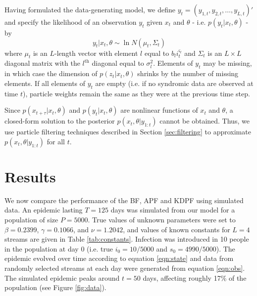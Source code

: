 \documentclass{elsarticle}
\begin{document}
Having formulated the data-generating model, we define $y_t = (y_{1,t},y_{2,t},\ldots,y_{L,t})'$ and specify the likelihood of an observation $y_t$ given $x_t$ and $\theta$ - i.e. $p(y_t|x_t,\theta)$ - by
\[ y_t\left|x_t,\theta\right. \sim \ln N\left(\mu_t,\Sigma_t\right) \]
\noindent where $\mu_t$ is an $L$-length vector with element $l$ equal to $b_li_t^{\varsigma_l}$ and $\Sigma_t$ is an $L \times L$ diagonal matrix with the $l^{\mbox{th}}$ diagonal equal to $\sigma_l^2$. Elements of $y_t$ may be missing, in which case the dimension of $p(z_t|x_t,\theta)$ shrinks by the number of missing elements. %
If all elements of $y_t$ are empty (i.e. if no syndromic data are observed at time $t$), particle weights remain the same as they were at the previous time step.


Since $p(x_{t+\tau}|x_t,\theta)$ and $p(y_t|x_t,\theta)$ are nonlinear functions of $x_t$ and $\theta$, a closed-form solution to the posterior $p(x_t,\theta|y_{1:t})$ cannot be obtained. Thus, we use particle filtering techniques described in Section \ref{sec:filtering} to approximate $p(x_t,\theta|y_{1:t})$ for all $t$.

\section{Results} \label{sec:results}

We now compare the performance of the BF, APF and KDPF using simulated data.  An epidemic lasting $T = 125$ days was simulated from our model for a population of size $P = 5000$. True values of unknown parameters were set to $\beta = 0.2399$, $\gamma = 0.1066$, and $\nu = 1.2042$, and values of known constants for $L = 4$ streams are given in Table \ref{tab:constants}. Infection was introduced in 10 people in the population at day 0 (i.e. true $i_0 = 10/5000$ and $s_0 = 4990/5000$). The epidemic evolved over time according to equation \eqref{eqn:state} and data from randomly selected streams at each day were generated from equation \eqref{eqn:obs}. The simulated epidemic peaks around $t = 50$ days, affecting roughly 17\% of the population (see Figure \ref{fig:data}).
\end{document}
